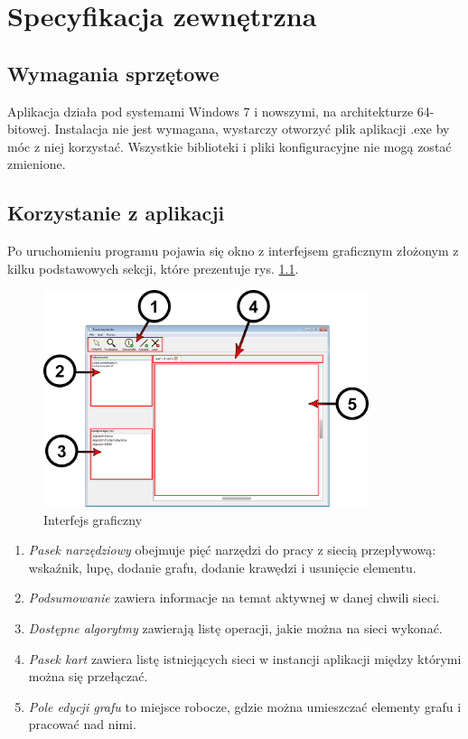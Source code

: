 \chapter{Specyfikacja zewnętrzna}
\section{Wymagania sprzętowe}
Aplikacja działa pod systemami Windows 7 i nowszymi, na architekturze 64-bitowej. Instalacja nie jest wymagana, wystarczy otworzyć plik aplikacji .exe by móc z niej korzystać. Wszystkie biblioteki i pliki konfiguracyjne nie mogą zostać zmienione.
\section{Korzystanie z aplikacji}
Po uruchomieniu programu pojawia się okno z interfejsem graficznym złożonym z kilku podstawowych sekcji, które prezentuje rys. \ref{fig:specZewInterfejs}.
\begin{figure}[H]
	\centering
	\includegraphics[width=0.85\textwidth]{./img/spec_zew01-1.png}
	\caption{Interfejs graficzny}
	\label{fig:specZewInterfejs}
\end{figure}
\begin{enumerate}
	\item \textit{Pasek narzędziowy} obejmuje pięć narzędzi do pracy z siecią przepływową: wskaźnik, lupę, dodanie grafu, dodanie krawędzi i usunięcie elementu.
	\item \textit{Podsumowanie} zawiera informacje na temat aktywnej w danej chwili sieci.
	\item \textit{Dostępne algorytmy} zawierają listę operacji, jakie można na sieci wykonać.
	\item \textit{Pasek kart} zawiera listę istniejących sieci w instancji aplikacji między którymi można się przełączać.
	\item \textit{Pole edycji grafu} to miejsce robocze, gdzie można umieszczać elementy grafu i pracować nad nimi.
\end{enumerate}

